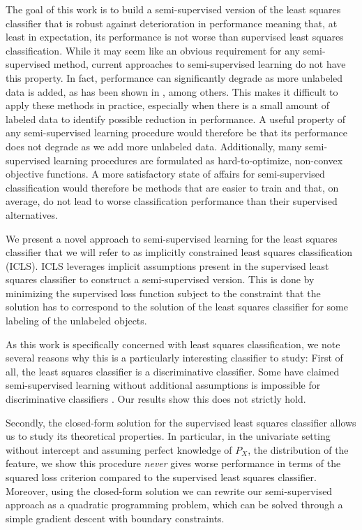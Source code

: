 \documentclass{elsarticle}
\begin{document}
The goal of this work is to build a semi-supervised version of the least squares classifier that is robust against deterioration in performance meaning that, at least in expectation, its performance is not worse than supervised least squares classification.
While it may seem like an obvious requirement for any semi-supervised method, current approaches to semi-supervised learning do not have this property. 
In fact, performance can significantly degrade as more unlabeled data is added, as has been shown in \cite{Cozman2006,Cozman2003}, among others.
This makes it difficult to apply these methods in practice, especially when there is a small amount of labeled data to identify possible reduction in performance.
A useful property of any semi-supervised learning procedure would therefore be that its performance does not degrade as we add more unlabeled data.
Additionally, many semi-supervised learning procedures are formulated as hard-to-optimize, non-convex objective functions. 
A more satisfactory state of affairs for semi-supervised classification would therefore be methods that are easier to train and that, on average, do not lead to worse classification performance than their supervised alternatives.

We present a novel approach to semi-supervised learning for the least squares classifier that we will refer to as implicitly constrained least squares classification (ICLS). ICLS leverages implicit assumptions present in the supervised least squares classifier to construct a semi-supervised version. This is done by minimizing the supervised loss function subject to the constraint that the solution has to correspond to the solution of the least squares classifier for some labeling of the unlabeled objects.

As this work is specifically concerned with least squares classification, we note several reasons why this is a particularly interesting classifier to study: 
First of all, the least squares classifier is a discriminative classifier. 
Some have claimed semi-supervised learning without additional assumptions is impossible for discriminative classifiers \cite{Seeger2001,Singh2008}. Our results show this does not strictly hold. 

Secondly, the closed-form solution for the supervised least squares classifier allows us to study its theoretical properties. In particular, in the univariate setting without intercept and assuming perfect knowledge of $P_X$, the distribution of the feature, we show this procedure \emph{never} gives worse performance in terms of the squared loss criterion compared to the supervised least squares classifier. Moreover, using the closed-form solution we can rewrite our semi-supervised approach as a quadratic programming problem, which can be solved through a simple gradient descent with boundary constraints.
\end{document}
